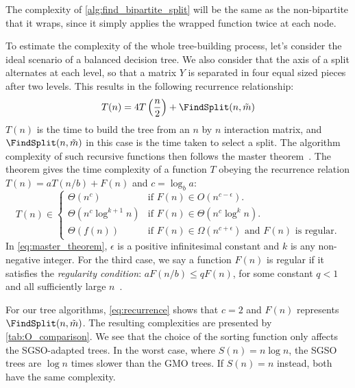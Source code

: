 The complexity of \ref{alg:find_bipartite_split} will be the same as the non-bipartite \FindSplit that it wraps, since it simply applies the wrapped function twice at each node.

To estimate the complexity of the whole tree-building process, let's consider the ideal scenario of a balanced decision tree.
We also consider that the axis of a split alternates at each level, so that a matrix $Y$ is separated in four equal sized pieces after two levels. This results in the following recurrence relationship:
%
\begin{equation}
    T(n) = 4T\left(\frac{n}{2}\right) + \FindSplit(n, \tilde m)
    \label{eq:recurrence}
\end{equation}
%
$T(n)$ is the time to build the tree from an $n$ by $n$ interaction matrix, and $\FindSplit(n,\tilde m)$ in this case is the time taken to select a split.
The algorithm complexity of such recursive functions then follows the master theorem~\cite{cormen2022introduction}. The theorem gives the time complexity of a function $T$ obeying the recurrence relation $T(n) = aT(n/b) + F(n)$ and $c=\log_b a$:
%
\begin{equation}
    T(n) \in \begin{cases}
        \Theta(n^c) & \text{if } F(n) \in O(n^{c-\epsilon}). \\
        \Theta(n^c \log^{k+1} n) & \text{if } F(n) \in \Theta(n^c \log^k n).\\
        \Theta(f(n)) & \text{if } F(n) \in \Omega(n^{c+\epsilon})
            \text{ and }F(n)\text{ is regular.}
    \end{cases}
    \label{eq:master_theorem}
\end{equation}
%
In \autoref{eq:master_theorem}, $\epsilon$ is a positive infinitesimal constant and $k$ is any non-negative integer. For the third case, we say a function $F(n)$ is regular if it satisfies the \emph{regularity condition}: $aF(n/b) \leq qF(n)$, for some constant $q < 1$ and all sufficiently large $n$~\cite{cormen2022introduction}.
 
For our tree algorithms, \autoref{eq:recurrence} shows that $c=2$ and $F(n)$ represents $\FindSplit(n, \tilde m)$.
The resulting complexities are presented by \autoref{tab:O_comparison}. We see that the choice of the sorting function only affects the SGSO-adapted trees. In the worst case, where $S(n) = n \log n$, the SGSO trees are $\log n$ times slower than the GMO trees. If $S(n) = n$ instead, both have the same complexity.

